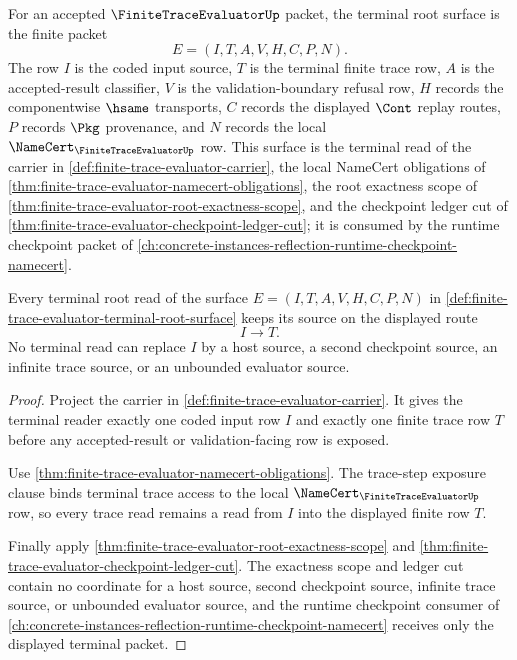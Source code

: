 \begin{definition}
\label{def:finite-trace-evaluator-terminal-root-surface}
For an accepted $\FiniteTraceEvaluatorUp$ packet, the terminal root surface is
the finite packet
$$
E=(I,T,A,V,H,C,P,N).
$$
The row $I$ is the coded input source, $T$ is the terminal finite trace row,
$A$ is the accepted-result classifier, $V$ is the validation-boundary refusal
row, $H$ records the componentwise $\hsame$ transports, $C$ records the
displayed $\Cont$ replay routes, $P$ records $\Pkg$ provenance, and $N$ records
the local $\NameCert_{\FiniteTraceEvaluatorUp}$ row. This surface is the
terminal read of the carrier in
\autoref{def:finite-trace-evaluator-carrier}, the local NameCert obligations
of \autoref{thm:finite-trace-evaluator-namecert-obligations}, the root
exactness scope of \autoref{thm:finite-trace-evaluator-root-exactness-scope},
and the checkpoint ledger cut of
\autoref{thm:finite-trace-evaluator-checkpoint-ledger-cut}; it is consumed by
the runtime checkpoint packet of
\autoref{ch:concrete-instances-reflection-runtime-checkpoint-namecert}.
\end{definition}

\begin{theorem}
\label{thm:finite-trace-evaluator-terminal-trace-source-lock}
Every terminal root read of the surface
$E=(I,T,A,V,H,C,P,N)$ in
\autoref{def:finite-trace-evaluator-terminal-root-surface} keeps its source on
the displayed route
$$
I \to T.
$$
No terminal read can replace $I$ by a host source, a second checkpoint source,
an infinite trace source, or an unbounded evaluator source.
\end{theorem}
\begin{proof}
Project the carrier in \autoref{def:finite-trace-evaluator-carrier}. It gives
the terminal reader exactly one coded input row $I$ and exactly one finite
trace row $T$ before any accepted-result or validation-facing row is exposed.

Use \autoref{thm:finite-trace-evaluator-namecert-obligations}. The trace-step
exposure clause binds terminal trace access to the local
$\NameCert_{\FiniteTraceEvaluatorUp}$ row, so every trace read remains a read
from $I$ into the displayed finite row $T$.

Finally apply \autoref{thm:finite-trace-evaluator-root-exactness-scope} and
\autoref{thm:finite-trace-evaluator-checkpoint-ledger-cut}. The exactness scope
and ledger cut contain no coordinate for a host source, second checkpoint
source, infinite trace source, or unbounded evaluator source, and the runtime
checkpoint consumer of
\autoref{ch:concrete-instances-reflection-runtime-checkpoint-namecert} receives
only the displayed terminal packet.
\end{proof}

